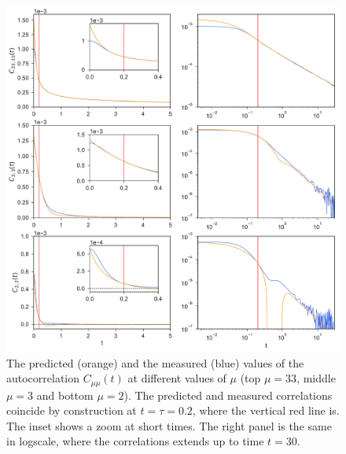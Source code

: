 \documentclass[a4paper,openright,12pt]{book}
\begin{document}
\begin{figure}[h!]
  \centering
\includegraphics[scale=0.45]{Predictions-WALLS-66nodes}
\caption[Predicted autocorrelations of $C(t)$ for 66 nodes.]{The predicted (orange) and the measured (blue) values of the autocorrelation $C_{\mu\mu}(t)$ at different values of $\mu$ (top $\mu=33$, middle $\mu=3$ and bottom $\mu=2$). The predicted and measured correlations coincide by construction at $t=\tau=0.2$, where the vertical red line is. The inset shows a zoom at short times. The right panel is the same in logscale, where the correlations extends up to time $t=30$.}
\label{fig:Predictions-WALLS-66nodes}
\end{figure}
\end{document}
